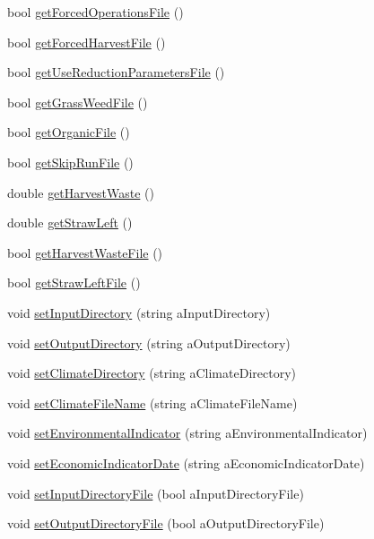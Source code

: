 \begin{DoxyCompactItemize}
\item 
bool \hyperlink{classsystem_data_a5ad15be68a7b24ea6948aaddf9a6221d}{getForcedOperationsFile} ()
\item 
bool \hyperlink{classsystem_data_af8016a557939d02507635ca9384fce59}{getForcedHarvestFile} ()
\item 
bool \hyperlink{classsystem_data_a94c623162f3a219efa744f8bd338895f}{getUseReductionParametersFile} ()
\item 
bool \hyperlink{classsystem_data_a64c75e78b2639c3807f9f9e5522591ed}{getGrassWeedFile} ()
\item 
bool \hyperlink{classsystem_data_ac84a9b532c8db55d09a6d5234472ecd1}{getOrganicFile} ()
\item 
bool \hyperlink{classsystem_data_ab27106df7d4567bd87168513a821f7c2}{getSkipRunFile} ()
\item 
double \hyperlink{classsystem_data_ad15611a79051878c86c1bba7949c7e2c}{getHarvestWaste} ()
\item 
double \hyperlink{classsystem_data_a19dca44278ca3c10d0d1344ee37b4957}{getStrawLeft} ()
\item 
bool \hyperlink{classsystem_data_a2289a94793e6bc2844640710a0b005e2}{getHarvestWasteFile} ()
\item 
bool \hyperlink{classsystem_data_a7b62ad26920711a35b12361f8f57afa2}{getStrawLeftFile} ()
\item 
void \hyperlink{classsystem_data_a8bdf9ac53eb541c563b2e6af18d1d645}{setInputDirectory} (string aInputDirectory)
\item 
void \hyperlink{classsystem_data_aa7d3df6c6a8bee4bce2f27a8a4cf16e1}{setOutputDirectory} (string aOutputDirectory)
\item 
void \hyperlink{classsystem_data_aaac71b9ffa354552b1a52673811e81f9}{setClimateDirectory} (string aClimateDirectory)
\item 
void \hyperlink{classsystem_data_a25dd785f92e7e407214d557331296247}{setClimateFileName} (string aClimateFileName)
\item 
void \hyperlink{classsystem_data_a9729b222f78ce6ba72382725e74c9fe1}{setEnvironmentalIndicator} (string aEnvironmentalIndicator)
\item 
void \hyperlink{classsystem_data_a201b496b05aa8478a9f5114da56177fe}{setEconomicIndicatorDate} (string aEconomicIndicatorDate)
\item 
void \hyperlink{classsystem_data_a83a4da7886d2efd14ca3413c1870a8ef}{setInputDirectoryFile} (bool aInputDirectoryFile)
\item 
void \hyperlink{classsystem_data_a4f7c590ce282999bcbcb24d4a260be36}{setOutputDirectoryFile} (bool aOutputDirectoryFile)

\end{DoxyCompactItemize}
